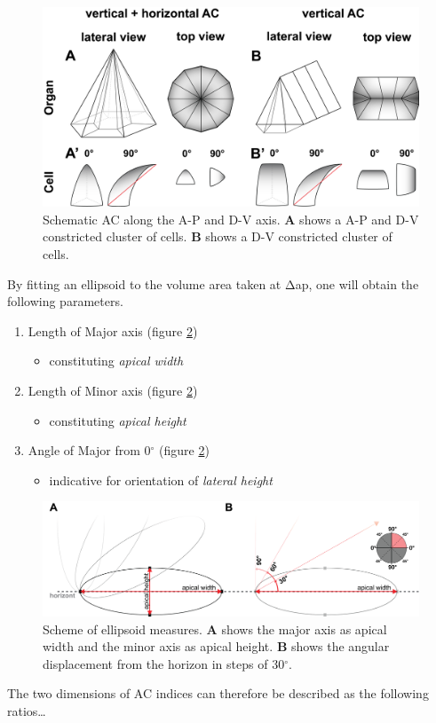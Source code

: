 \documentclass[11pt,singlespacinge,twoside]{reedthesis} %
\providecommand{\tightlist}{%
  \setlength{\itemsep}{0pt}\setlength{\parskip}{0pt}}
\begin{document}
\begin{figure}

{\centering \includegraphics[width=0.75\linewidth]{figure/02-MaMo/ACI/ACI_Cells_pol} 

}

\caption[Schematic anisotropic AC]{Schematic AC along the A-P and D-V axis. \textbf{A} shows a A-P and D-V constricted cluster of cells. \textbf{B} shows a D-V constricted cluster of cells.}\label{fig:cellpol}
\end{figure}
\noindent By fitting an ellipsoid to the volume area taken at \(\mathrm{\Delta}\)ap, one will obtain the following parameters.
\begin{enumerate}
\def\labelenumi{\arabic{enumi}.}
\tightlist
\item
  Length of Major axis (figure \ref{fig:ellipse})
  \begin{itemize}
  \tightlist
  \item
    constituting \emph{apical width}
  \end{itemize}
\item
  Length of Minor axis (figure \ref{fig:ellipse})
  \begin{itemize}
  \tightlist
  \item
    constituting \emph{apical height}
  \end{itemize}
\item
  Angle of Major from 0\(^\circ\) (figure \ref{fig:ellipse})
  \begin{itemize}
  \tightlist
  \item
    indicative for orientation of \emph{lateral height}
  \end{itemize}
\end{enumerate}

\begin{figure}

{\centering \includegraphics[width=0.75\linewidth]{figure/02-MaMo/ACI/ellipse} 

}

\caption[Scheme of ellipsoid measures]{Scheme of ellipsoid measures. \textbf{A} shows the major axis as apical width and the minor axis as apical height. \textbf{B} shows the angular displacement from the horizon in steps of 30\(^\circ\).}\label{fig:ellipse}
\end{figure}
The two dimensions of AC indices can therefore be described as the following ratios\ldots{}
\end{document}

